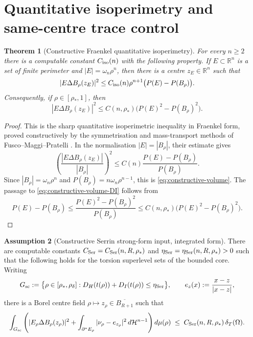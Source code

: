 \documentclass[11pt]{amsart}
\newtheorem{theorem}{Theorem}[section]
\theoremstyle{definition}
\newtheorem{assumption}[theorem]{Assumption}
\newcommand{\R}{\mathbb R}
\newcommand{\Om}{\Omega}
\newcommand{\dT}{\delta_T}
\newcommand{\rstar}{\rho_*}
\newcommand{\rdel}{\rho_\delta}
\newcommand{\Hn}{\mathcal H^{n-1}}
\newcommand{\Per}{P}
\begin{document}
\section{Quantitative isoperimetry and same-centre trace control}
\label{sec:samecentre}

\begin{theorem}[Constructive Fraenkel quantitative isoperimetry]
\label{thm:constructive-fraenkel}
For every \(n\ge2\) there is a computable constant
\(C_{\rm iso}(n)\) with the following property.  If
\(E\subset\R^n\) is a set of finite perimeter and
\(|E|=\omega_n\rho^n\), then there is a centre \(z_E\in\R^n\) such that
\begin{equation}\label{eq:constructive-volume}
   |E\Delta B_\rho(z_E)|^2
   \le
   C_{\rm iso}(n)\rho^{n+1}\bigl(\Per(E)-\Per(B_\rho)\bigr).
\end{equation}
Consequently, if \(\rho\in[\rstar,1]\), then
\begin{equation}\label{eq:constructive-volume-DI}
   |E\Delta B_\rho(z_E)|^2
   \le C(n,\rstar)\bigl(\Per(E)^2-\Per(B_\rho)^2\bigr).
\end{equation}
\end{theorem}

\begin{proof}
This is the sharp quantitative isoperimetric inequality in Fraenkel form,
proved constructively by the symmetrisation and mass-transport methods of
Fusco--Maggi--Pratelli \cite{FMP}.  In the normalisation
\(|E|=|B_\rho|\), their estimate gives
\[
   \left(\frac{|E\Delta B_\rho(z_E)|}{|B_\rho|}\right)^2
   \le C(n)\frac{\Per(E)-\Per(B_\rho)}{\Per(B_\rho)} .
\]
Since \(|B_\rho|=\omega_n\rho^n\) and
\(\Per(B_\rho)=n\omega_n\rho^{n-1}\), this is
\eqref{eq:constructive-volume}.  The passage to
\eqref{eq:constructive-volume-DI} follows from
\[
   \Per(E)-\Per(B_\rho)
   \le \frac{\Per(E)^2-\Per(B_\rho)^2}{\Per(B_\rho)}
   \le C(n,\rstar)\bigl(\Per(E)^2-\Per(B_\rho)^2\bigr).
\]
\end{proof}

\begin{assumption}[Constructive Serrin strong-form input, integrated form]
\label{ass:constructive-strong}
There are computable constants
\(C_{\rm Ser}=C_{\rm Ser}(n,R,\rstar)\) and
\(\eta_{\rm Ser}=\eta_{\rm Ser}(n,R,\rstar)>0\) such that the following holds
for the torsion superlevel sets of the bounded core.  Writing
\[
   G_{\rm sc}:=\bigl\{\rho\in[\rstar,\rdel]:D_H(t(\rho))+D_I(t(\rho))\le
   \eta_{\rm Ser}\bigr\},
   \qquad
   e_z(x):=\frac{x-z}{|x-z|},
\]
there is a Borel centre field \(\rho\mapsto z_\rho\in\overline{B_{R+1}}\) such
that
\begin{equation}\label{eq:constructive-strong}
   \int_{G_{\rm sc}}
   \left(
      |E_\rho\Delta B_\rho(z_\rho)|^2
      +
      \int_{\partial^*E_\rho}|\nu_\rho-e_{z_\rho}|^2\,d\Hn
   \right)d\mu(\rho)
   \;\le\;
   C_{\rm Ser}(n,R,\rstar)\,\dT(\Om).
\end{equation}
\end{assumption}
\end{document}
